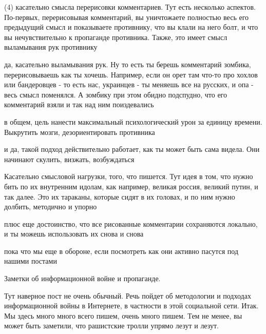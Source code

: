 (4) касательно смысла перерисовки комментариев. Тут есть несколько аспектов.
По-первых, перерисовывая комментарий, вы уничтожаете полностью весь его
предыдущий смысл и показываете противнику, что вы клали на него болт, и что вы
нечувствительно к пропаганде противника. Также, это имеет смысл выламывания рук
противнику

да, касательно выламывания рук. Ну то есть ты берешь комментарий зомбика,
перерисовываешь как ты хочешь. Например, если он орет там что-то про хохлов или
бандеровцев - то есть нас, украинцев - ты меняешь все на русских, и опа - весь
смысл поменялся. А зомбику при этом обидно подспудно, что его комментарий взяли
и так над ним поиздевались

в общем, цель нанести максимальный психологический урон за единицу времени.
Выкрутить мозги, дезориентировать противника

и да, такой подход действительно работает, как ты может быть сама видела. Они
начинают скулить, визжать, возбуждаться

Касательно смысловой нагрузки, того, что пишется. Тут идея в том, что нужно
бить по их внутренним идолам, как например, великая россия, великий путин, и
так далее. Это их тараканы, которые сидят в их головах, и по ним нужно долбить,
методично и упорно

плюс еще достоинство, что все рисованные комментарии сохраняются локально, и ты
можешь использовать их снова и снова

пока что мы еще в обороне, если посмотреть как они активно пасутся под нашими
постами

Заметки об информационной войне и пропаганде.

Тут наверное пост не очень обычный. Речь пойдет об методологии и подходах
информационной войны в Интернете, в частности в этой социальной сети. Итак. Мы
здесь много много всего пишем, очень много пишем. Тем не менее, вы может быть
заметили, что рашистские тролли упрямо лезут и лезут.


